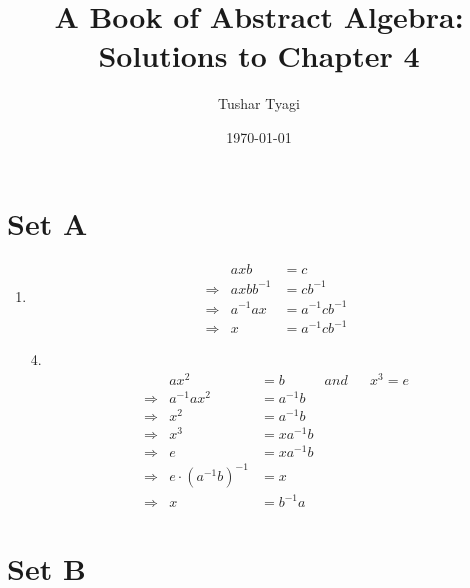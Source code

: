 \documentclass[12pt]{article}
\begin{document}
\title{A Book of Abstract Algebra: Solutions to Chapter 4}
\author{Tushar Tyagi}
\date{\today}
\maketitle

\section*{Set A}
\begin{enumerate}

\item 
\begin{align*}
&& axb &= c \\
& \Rightarrow & axbb^{-1} &= cb^{-1} \\
& \Rightarrow & a^{-1}ax  &= a^{-1}cb^{-1}\\
& \Rightarrow & x        &= a^{-1}cb^{-1}
\end{align*}

\item [4.]
\begin{align*}
&                     & ax^2             &= b & and && x^3 = e \\
& \Rightarrow & a^{-1}ax^2 &= a^{-1}b \\
& \Rightarrow & x^2              &= a^{-1}b \\
& \Rightarrow & x^3              &= xa^{-1}b \\
& \Rightarrow & e                   &= xa^{-1}b \\
& \Rightarrow & e \cdot (a^{-1}b)^{-1} &= x \\
& \Rightarrow & x                 &= b^{-1}a
\end{align*}

\end{enumerate}




\section*{Set B}
\end{document}
